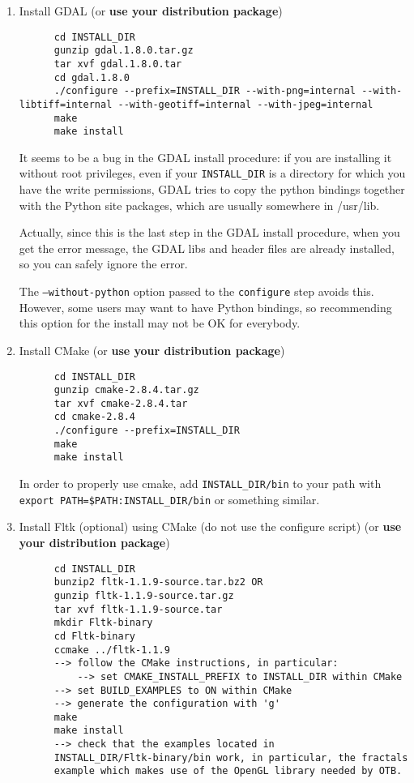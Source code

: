 \begin{enumerate}

\item Install GDAL (or \textbf{use your distribution package})
  \begin{verbatim}
      cd INSTALL_DIR
      gunzip gdal.1.8.0.tar.gz
      tar xvf gdal.1.8.0.tar
      cd gdal.1.8.0
      ./configure --prefix=INSTALL_DIR --with-png=internal --with-libtiff=internal --with-geotiff=internal --with-jpeg=internal
      make
      make install
  \end{verbatim}

It seems to be a bug in the GDAL install procedure: if you are installing it without root privileges, even if your \texttt{INSTALL\_DIR} is a directory for which you have the write permissions, GDAL tries to copy the python bindings together with the Python site packages, which are usually somewhere in /usr/lib.

Actually, since this is the last step in the GDAL install procedure, when you get the error message, the GDAL libs and header files are already installed, so you can safely ignore the error.

The \texttt{--without-python} option passed to the \texttt{configure} step avoids this. However, some users may want to have Python bindings, so recommending this option for the install may not be OK for everybody.

\item Install CMake (or \textbf{use your distribution package})
  \begin{verbatim}
      cd INSTALL_DIR
      gunzip cmake-2.8.4.tar.gz
      tar xvf cmake-2.8.4.tar
      cd cmake-2.8.4
      ./configure --prefix=INSTALL_DIR
      make
      make install
  \end{verbatim}
      In order to properly use cmake, add \texttt{INSTALL\_DIR/bin} to
      your path with \texttt{export PATH=\$PATH:INSTALL\_DIR/bin} or
      something similar.

\item Install Fltk (optional) using CMake (do not use the configure script) (or \textbf{use your distribution package})
  \begin{verbatim}
      cd INSTALL_DIR
      bunzip2 fltk-1.1.9-source.tar.bz2 OR
      gunzip fltk-1.1.9-source.tar.gz
      tar xvf fltk-1.1.9-source.tar
      mkdir Fltk-binary
      cd Fltk-binary
      ccmake ../fltk-1.1.9
      --> follow the CMake instructions, in particular:
          --> set CMAKE_INSTALL_PREFIX to INSTALL_DIR within CMake
	  --> set BUILD_EXAMPLES to ON within CMake
	  --> generate the configuration with 'g'
      make
      make install
      --> check that the examples located in
      INSTALL_DIR/Fltk-binary/bin work, in particular, the fractals
      example which makes use of the OpenGL library needed by OTB.
  \end{verbatim}


\end{enumerate}
